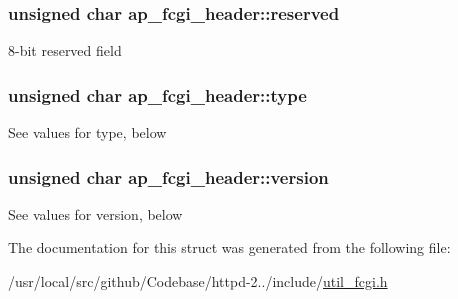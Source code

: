\subsubsection[{\texorpdfstring{reserved}{reserved}}]{\setlength{\rightskip}{0pt plus 5cm}unsigned char ap\+\_\+fcgi\+\_\+header\+::reserved}\hypertarget{structap__fcgi__header_a26f15c205fc8cbb0987636081adf5402}{}\label{structap__fcgi__header_a26f15c205fc8cbb0987636081adf5402}
8-\/bit reserved field 
\subsubsection[{\texorpdfstring{type}{type}}]{\setlength{\rightskip}{0pt plus 5cm}unsigned char ap\+\_\+fcgi\+\_\+header\+::type}\hypertarget{structap__fcgi__header_a09797b9bd0fefaa9d9883605e177080c}{}\label{structap__fcgi__header_a09797b9bd0fefaa9d9883605e177080c}
See values for type, below 
\subsubsection[{\texorpdfstring{version}{version}}]{\setlength{\rightskip}{0pt plus 5cm}unsigned char ap\+\_\+fcgi\+\_\+header\+::version}\hypertarget{structap__fcgi__header_a88df2a2ab4436eb42a99c02c9293e0de}{}\label{structap__fcgi__header_a88df2a2ab4436eb42a99c02c9293e0de}
See values for version, below 

The documentation for this struct was generated from the following file\+:\begin{DoxyCompactItemize}
\item 
/usr/local/src/github/\+Codebase/httpd-\/2../include/\hyperlink{util__fcgi_8h}{util\+\_\+fcgi.\+h}\end{DoxyCompactItemize}
